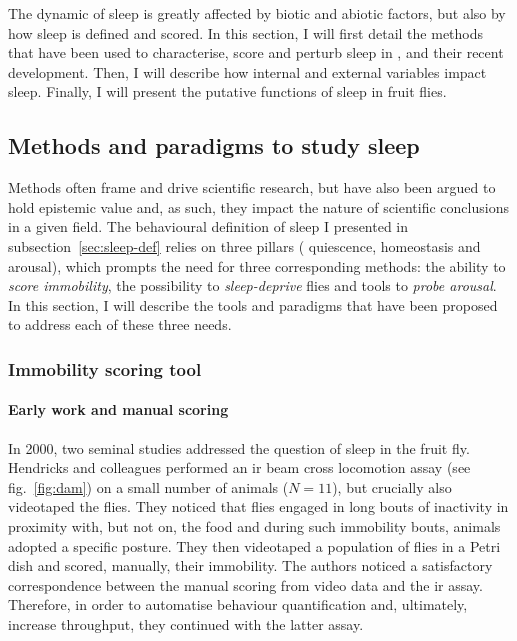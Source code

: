 


The dynamic of sleep is greatly affected by biotic and abiotic factors, but also by how sleep is defined and scored. 
In this section, I will first detail the methods 
that have been used to characterise, score and perturb sleep in \droso, and their recent development.
Then, I will describe how internal and external variables impact sleep.
Finally, I will present the putative functions of sleep in fruit flies.

\subsection{Methods and paradigms to study sleep}

Methods often frame and drive scientific research, but have also been argued to hold epistemic value and, as such, they impact the nature of scientific conclusions in a given field\cite{baird_thing_2004}.
The behavioural definition of sleep I presented in subsection~\ref{sec:sleep-def} relies on three pillars (\ie{} quiescence, homeostasis and arousal),
which prompts the need for three corresponding methods:
the ability to \emph{score immobility}, the possibility to \emph{sleep-deprive} flies and tools to \emph{probe arousal}.
In this section, I will describe the tools and paradigms that have been proposed to address each of these three needs.

\subsubsection{Immobility scoring tool}

\label{sec:immob}

\paragraph*{Early work and manual scoring}
In 2000, two seminal studies addressed the question of sleep in the fruit fly\cite{hendricks_rest_2000,shaw_correlates_2000}.
Hendricks and colleagues performed an \gls{ir} beam cross locomotion assay (see fig.~\ref{fig:dam}) on a small number of animals ($N=11$), but crucially also videotaped the flies\cite{hendricks_rest_2000}.
They noticed that flies engaged in long bouts of inactivity in proximity with, but not on, the food and during such immobility bouts, animals adopted a specific posture.
They then videotaped a population of flies in a Petri dish and scored, manually, their immobility.
The authors noticed a satisfactory correspondence between the manual scoring from video data and the \gls{ir} assay.
Therefore, in order to automatise behaviour quantification and, ultimately, increase throughput, they continued  with the latter assay.

